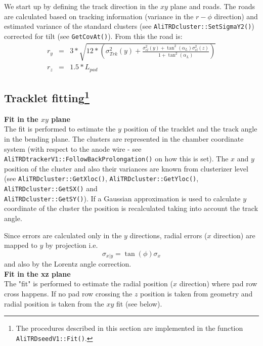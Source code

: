 \documentclass{alicetdr}
\begin{document}
We start up by defining the track direction in the $xy$ plane and roads. The
roads are calculated based on tracking information (variance in the $r-\phi$
direction) and estimated variance of the standard clusters (see
{\tt AliTRDcluster::SetSigmaY2()}) corrected for tilt (see {\tt GetCovAt()}).
From this the road is:
\begin{eqnarray}
r_{y} &=& 3*\sqrt{12*(\sigma^{2}_{Trk}(y) + \frac{\sigma^{2}_{cl}(y)
+ \tan^{2}(\alpha_{L})\sigma^{2}_{cl}(z)}{1+\tan^{2}(\alpha_{L})})}\\
r_{z} &= &1.5*L_{pad}
\end{eqnarray}

\subsection[Tracklet fitting]{Tracklet fitting\footnote{The procedures described in this
section are implemented in the function
{\tt AliTRDseedV1::Fit()}.}}\label{REC:Tracking:TrackletFit}

\noindent
{\bf Fit in the $xy$ plane}
\\

The fit is performed to estimate the $y$ position of the tracklet and the track
angle in the bending plane. The clusters are represented in the chamber coordinate
system (with respect to the anode wire - see
{\tt AliTRDtrackerV1::FollowBackProlongation()} on how this is set). The $x$ and $y$
position of the cluster and also their variances are known from clusterizer level
(see {\tt AliTRDcluster::GetXloc()},
{\tt AliTRDcluster::GetYloc()}, {\tt AliTRDcluster::GetSX()} and \\
{\tt AliTRDcluster::GetSY()}). If a Gaussian approximation is used to calculate
$y$ coordinate of the cluster the position is recalculated taking into account the
track angle.

Since errors are calculated only in the $y$ directions, radial errors ($x$ direction)
are mapped to $y$ by projection i.e.
\begin{equation}
\sigma_{x|y} = \tan(\phi) \sigma_{x}
\end{equation}
and also by the Lorentz angle correction.
\\

\noindent
{\bf Fit in the xz plane}
\\

The "fit" is performed to estimate the radial position ($x$ direction) where pad
row cross happens. If no pad row crossing the $z$ position is taken from geometry
and radial position is taken from the $xy$ fit (see below).
\end{document}
